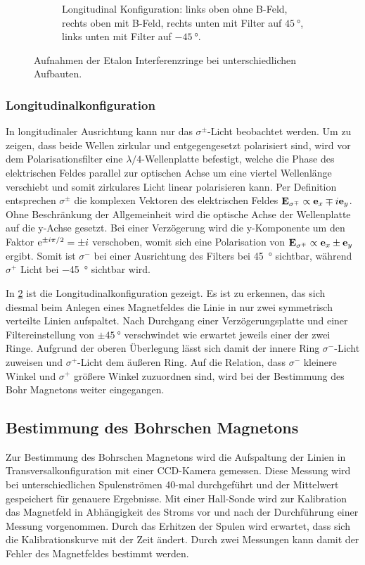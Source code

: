 \begin{figure}[h]
\begin{subfigure}{0.45\linewidth}
        \caption{Longitudinal Konfiguration: links oben ohne B-Feld, rechts oben mit B-Feld, 
        rechts unten mit Filter auf $\SI{+45}{\degree}$, links unten mit Filter auf $\SI{-45}{\degree}$. }
        \label{fig:longitudinal_konfiguration}
    \end{subfigure}
    \caption{Aufnahmen der Etalon Interferenzringe bei unterschiedlichen Aufbauten.}
\end{figure}


\subsubsection{Longitudinalkonfiguration}
In longitudinaler Ausrichtung kann nur das $\sigma^\pm$-Licht beobachtet werden. Um zu zeigen, 
dass beide Wellen zirkular und entgegengesetzt polarisiert sind, wird vor dem Polarisationsfilter 
eine $\lambda/4$-Wellenplatte befestigt, welche die Phase des elektrischen Feldes parallel 
zur optischen Achse um eine viertel Wellenlänge verschiebt und somit zirkulares Licht 
linear polarisieren kann. Per Definition entsprechen $\sigma^\pm$ die komplexen Vektoren des 
elektrischen Feldes 
$\vb E_\mathrm{\sigma^\mp} \propto \vb e_x \mp i\vb e_y$. Ohne Beschränkung der Allgemeinheit wird die optische Achse 
der Wellenplatte auf die y-Achse gesetzt. Bei einer Verzögerung wird die y-Komponente 
um den Faktor $\mathrm e^{\pm i\pi /2} = \pm i$ verschoben, womit sich eine Polarisation von 
$\vb E_\mathrm{\sigma^\mp}\propto \vb e_x \pm \vb e_y$ ergibt. Somit ist $\sigma^-$ 
bei einer Ausrichtung des Filters bei \SI{45}{\degree} sichtbar, während $\sigma^+$ Licht 
bei \SI{-45}{\degree} sichtbar wird. 

In \cref{fig:longitudinal_konfiguration} ist die Longitudinalkonfiguration gezeigt. Es ist zu erkennen,
das sich diesmal beim Anlegen eines Magnetfeldes die Linie in nur zwei symmetrisch verteilte Linien 
aufspaltet. Nach Durchgang einer Verzögerungsplatte und einer Filtereinstellung von $\pm\SI{45}{\degree}$
verschwindet wie erwartet jeweils einer der zwei Ringe. Aufgrund der oberen Überlegung 
lässt sich damit der innere Ring $\sigma^-$-Licht zuweisen und $\sigma^+$-Licht dem äußeren Ring.
Auf die Relation, dass $\sigma^-$ kleinere Winkel und $\sigma^+$ größere Winkel zuzuordnen sind, wird 
bei der Bestimmung des Bohr Magnetons weiter eingegangen.



\subsection{Bestimmung des Bohrschen Magnetons}\label{sec:magneton}
Zur Bestimmung des Bohrschen Magnetons wird die Aufspaltung der Linien 
in Transversalkonfiguration mit einer CCD-Kamera gemessen. Diese Messung wird 
bei unterschiedlichen Spulenströmen 40-mal durchgeführt und der Mittelwert 
gespeichert für genauere Ergebnisse. Mit einer Hall-Sonde wird 
zur Kalibration das Magnetfeld in Abhängigkeit des Stroms vor und nach der Durchführung
einer Messung vorgenommen. Durch das Erhitzen der Spulen wird erwartet, dass sich 
die Kalibrationskurve mit der Zeit ändert. Durch zwei Messungen kann damit der Fehler des 
Magnetfeldes bestimmt werden.

